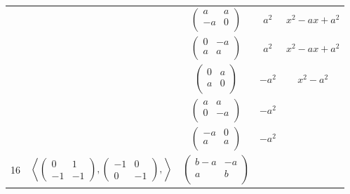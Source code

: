 \documentclass[a4paper,12pt]{amsart}
\begin{document}
\begin{table}[h]
\begin{tabular}{|c|c|c|c|c|}
			& &  $\begin{pmatrix}
				a & a \\        
				-a & 0 \\
			\end{pmatrix}$
			
			&   $a^2$     &       $ x^2 - ax + a^2$                       \\
			
			
			& &  $\begin{pmatrix}
				0 & -a \\        
				a & a \\
			\end{pmatrix}$
			
			&   $a^2$   &   $x^2 - ax + a^2$                \\
			
			
			& &  $\begin{pmatrix}
				0 & a \\        
				a & 0 \\
			\end{pmatrix}$
			
			&   $-a^2$   &   $x^2 - a^2$                \\
			
			
			& & $\begin{pmatrix}
				a & a \\        
				0 & -a \\
			\end{pmatrix}$
			
			&  $-a^2$   &            \\
			
			
			& &  $\begin{pmatrix}
				-a & 0 \\        
				a & a \\
			\end{pmatrix}$
			
			&   $-a^2$     &                           \\
			
			\hline
			
			
			\multirow{2}{*}{16}
			& \multirow{2}{*}{
				$\left\langle 
				\begin{pmatrix}
					0 & 1 \\ 
					-1 & -1 
				\end{pmatrix},
				\begin{pmatrix}
					-1 & 0 \\ 
					0 & -1 
				\end{pmatrix}, 
				\right\rangle$	
			}	
			&  $\begin{pmatrix}
				b-a & -a \\        
				a & b \\
			\end{pmatrix}$
			

\end{tabular}
\end{table}
\end{document}
